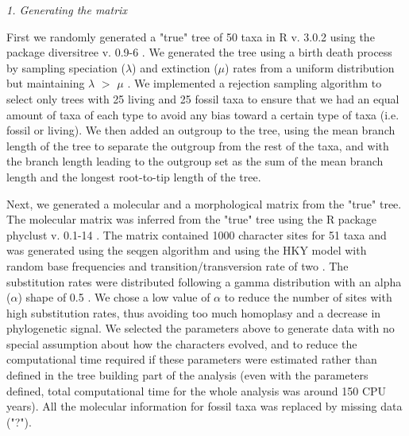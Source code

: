 \documentclass[12pt,letterpaper]{article}
\renewcommand{\subsection}[1]{%
\bigskip
\begin{center}
\begin{large}
\normalfont\itshape #1
\end{large}
\end{center}}
\begin{document}
\subsection{1. Generating the matrix}
\label{Generating_the_matrix}
First we randomly generated a "true" tree of 50 taxa in R v. 3.0.2 \citep{R302} using the package diversitree v. 0.9-6 \citep{fitzjohndiversitree2012}. We generated the tree using a birth death process by sampling speciation ($\lambda$) and extinction ($\mu$) rates from a uniform distribution but maintaining $\lambda$ $>$ $\mu$ \citep{paradistime-dependent2011}. We implemented a rejection sampling algorithm to select only trees with 25 living and 25 fossil taxa 
to ensure that we had an equal amount of taxa of each type to avoid any bias toward a certain type of taxa (i.e. fossil or living). We then added an outgroup to the tree, using the mean branch length of the tree to separate the outgroup from the rest of the taxa, and with the branch length leading to the outgroup set as the sum of the mean branch length and the longest root-to-tip length of the tree.

Next, we generated a molecular and a morphological matrix from the "true" tree. The molecular matrix was inferred from the "true" tree using the R package phyclust v. 0.1-14 \citep{chen2011}. The matrix contained 1000 character sites for 51 taxa and was generated using the seqgen algorithm \citep{ranbaut1997seqgen} and using the HKY model \citep{HKY85} with random base frequencies and transition/transversion rate of two \citep{douadycomparison2003}. The substitution rates were distributed following a gamma distribution with an alpha ($\alpha$) shape of 0.5 \citep{yangamong-site1996}. We chose a low value of $\alpha$ to reduce the number of sites with high substitution rates, thus avoiding too much homoplasy and a decrease in phylogenetic signal. We selected the parameters above to generate data with no special assumption about how the characters evolved, and to reduce the computational time required if these parameters were estimated rather than defined in the tree building part of the analysis (even with the parameters defined, total computational time for the whole analysis was around 150 CPU years). All the molecular information for fossil taxa was replaced by missing data ("?").
\end{document}
